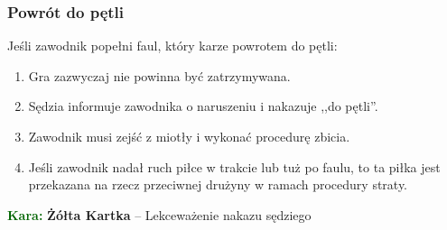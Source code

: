 \documentclass[11pt,a4paper]{article}
\newcommand\yellowcard[1]{\bgroup\textcolor{darkgreen}{\textbf{Kara: }}\bgroup\textcolor{darkyellow}{\textbf{Żółta Kartka}} -- #1}
\begin{document}
\subsubsection{Powrót do pętli}
Jeśli zawodnik popełni faul, który karze powrotem do pętli:
\begin{enumerate}
  \item Gra zazwyczaj nie powinna być zatrzymywana.
  \item Sędzia informuje zawodnika o naruszeniu i nakazuje ,,do pętli''.
  \item Zawodnik musi zejść z miotły i wykonać procedurę zbicia.
  \item Jeśli zawodnik nadał ruch piłce w trakcie lub tuż po faulu, to ta piłka jest przekazana na rzecz przeciwnej drużyny w ramach procedury straty.
\end{enumerate}

\yellowcard{Lekceważenie nakazu sędziego}
\end{document}
